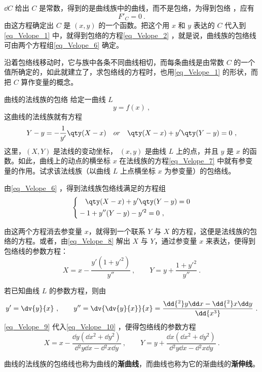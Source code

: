 $\dd C$ 给出 $C$ 是常数，得到的是曲线族中的曲线，而不是包络，为得到包络
，应有
\begin{equation}
F'_C=0~.
\end{equation}
由这方程确定出 $C$ 是 $(x,y)$ 的一个函数。把这个用 $x$ 和 $y$ 表达的 $C$ 代入到\autoref{eq_Velope_1} 中，就得到包络的方程\autoref{eq_Velope_2} ，就是说，曲线族的包络线可由两个方程组\autoref{eq_Velope_6} 确定。

沿着包络线移动时，它与族中各条不同曲线相切，而每条曲线是由常数 $C$ 的一个值所确定的，如此就建立了，求包络线的方程时，也用\autoref{eq_Velope_1} 的形状，而把 $C$ 算作变量的概念。
\begin{example}{曲线的法线族的包络}
给定一曲线 $L$
\begin{equation}
y=f(x)~,
\end{equation}
这曲线的法线族就有方程
\begin{equation}\label{eq_Velope_7}
Y-y=-\frac{1}{y'}\qty(X-x)\quad or\quad\qty(X-x)+y'\qty(Y-y)=0~,
\end{equation}
这里，$(X,Y)$ 是法线的变动坐标， $(x,y)$ 是曲线 $L$ 上的点，并且 $y$ 是 $x$ 的函数。如此，曲线上的动点的横坐标 $x$ 在法线族的方程\autoref{eq_Velope_7} 中就有参变量的作用。试求该法线族（以曲线 $L$ 上点横坐标 $x$ 为参变量）的包络线。

由\autoref{eq_Velope_6} ，得到法线族包络线满足的方程组
\begin{equation}\label{eq_Velope_8}
\left\{\begin{aligned}
&\quad\qty(X-x)+y'\qty(Y-y)=0\\
&-1+y''(Y-y)-y'^2=0~,
\end{aligned}\right.
\end{equation}
 

由这两个方程消去参变量 $x$，就得到一个联系 $Y$ 与 $X$ 的方程，这便是法线族的包络的方程。或者，由\autoref{eq_Velope_8} 解出 $X$ 与 $Y$，通过参变量 $x$ 来表达，便得到包络线的参数方程：
\begin{equation}\label{eq_Velope_10}
X=x-\frac{y'(1+y'^2)}{y''}~,\qquad Y=y+\frac{1+y'^2}{y''}~.
\end{equation}

若已知曲线 $L$ 的参数方程，则由
\begin{equation}\label{eq_Velope_9}
y'=\dv{y}{x}~,\qquad y''=\dv{\dv{y}{x}}{x}=\frac{\dd{^2}y\dd x-\dd{^2}x\dd y}{\dd{x^3}}~.
\end{equation}
\autoref{eq_Velope_9} 代入\autoref{eq_Velope_10} ，便得包络线的参数方程
\begin{equation}
X=x-\frac{\dd y(\dd x^2+\dd y^2)}{\dd{^2y\dd x}-\dd{^2x}\dd y}~,
\qquad Y=y+\frac{\dd x(\dd x^2+\dd y^2)}{\dd{^2y}\dd x-\dd{^2x}\dd y}~.
\end{equation}

曲线的法线族的包络线也称为曲线的\textbf{渐曲线}，而曲线也称为它的渐曲线的\textbf{渐伸线}。
\end{example}